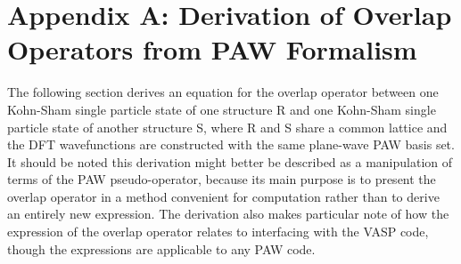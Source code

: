 \documentclass[12pt]{article}
\begin{document}
\section*{Appendix A: Derivation of Overlap Operators from PAW Formalism}

The following section derives an equation for the overlap operator between one
Kohn-Sham single particle state of one structure R and one Kohn-Sham single
particle state of another structure S, where R and S share a common lattice
and the DFT wavefunctions are constructed with the same plane-wave PAW basis set.
It should be noted this derivation might better be described as a manipulation
of terms of the PAW pseudo-operator, because its main purpose is to present
the overlap operator in a method convenient for computation rather than to derive
an entirely new expression. The derivation also makes particular note of how
the expression of the overlap operator relates to interfacing with the VASP code,
though the expressions are applicable to any PAW code.
\end{document}
